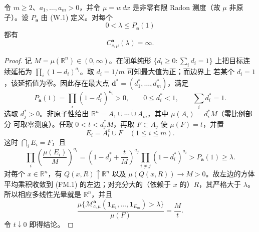 \begin{proposition}[有限总质量时的内禀临界发散]\label{prop:finite-mass-critical}
令 $m\ge2$、$a_1,\ldots,a_m>0$，并令 $\mu=w\,dx$ 是非零有限
Radon 测度（故 $\mu$ 非原子）。设 $P_{\boldsymbol a}$ 由
\textup{\rm(W.1)} 定义。对每个
\[
 0<\lambda\le P_{\boldsymbol a}(1)
\]
都有
\[
 C_{c,\mu}^{\boldsymbol a}(\lambda)=\infty.
\]
\end{proposition}

\begin{proof}
记 $M=\mu(\mathbb R^n)\in(0,\infty)$。在闭单纯形
$\{d_i\ge0:\sum_i d_i=1\}$ 上把目标连续延拓为
$\prod_i(1-d_i)^{a_i}$。取 $d_i=1/m$ 可知最大值为正；而边界上
若某个 $d_i=1$，该延拓值为零。因此存在最大点
$\boldsymbol d^*=(d_1^*,\ldots,d_m^*)$，满足
\[
 P_{\boldsymbol a}(1)=\prod_i(1-d_i^*)^{a_i}>0,
 \qquad 0\le d_i^*<1,\qquad \sum_i d_i^*=1.
\]
选取 $d_j^*>0$。非原子性给出 $\mathbb R^n=A_1\mathbin{\dot\cup}
\cdots\mathbin{\dot\cup}A_m$，其中 $\mu(A_i)=d_i^*M$（零比例部分
可取零测度）。任取 $0<t<d_j^*M$，再取 $F\subset A_j$ 使
$\mu(F)=t$，并置
\[
 E_i=A_i^c\cup F\quad(1\le i\le m).
\]
这时 $\bigcap_iE_i=F$，且
\[
 \prod_i\left(\frac{\mu(E_i)}M\right)^{a_i}
 =\left(1-d_j^*+\frac tM\right)^{a_j}
   \prod_{i\ne j}(1-d_i^*)^{a_i}
 >P_{\boldsymbol a}(1)\ge\lambda. \tag{FM.1}
\]
对每个 $x\in\mathbb R^n$，有 $Q(x,R)\uparrow\mathbb R^n$ 以及
$\mu(Q(x,R))\to M>0$。故左边的方体平均乘积收敛到 \textup{(FM.1)}
的左边；对充分大的（依赖于 $x$ 的）$R$，其严格大于 $\lambda$。
所以相应多线性光晕就是 $\mathbb R^n$，并且
\[
 \frac{\mu\{\mathcal M_{c,\mu}^{\boldsymbol a}
 (\mathbf1_{E_1},\ldots,\mathbf1_{E_m})>\lambda\}}{\mu(F)}
 =\frac Mt.
\]
令 $t\downarrow0$ 即得结论。
\end{proof}
